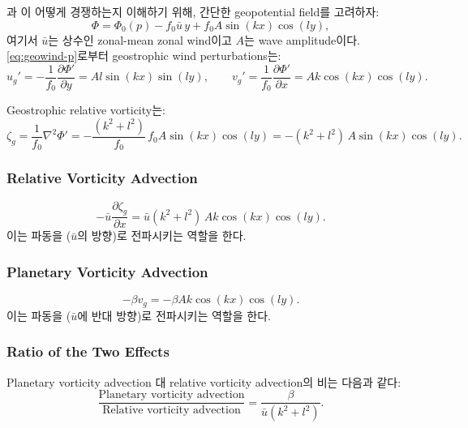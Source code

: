과
이 어떻게 경쟁하는지 이해하기 위해,
간단한 geopotential field를 고려하자:
\begin{equation}\label{eq:wave-geopot}
  \Phi = \Phi_0(p) - f_0\bar{u}\,y + f_0 A\sin(kx)\cos(ly),
\end{equation}
여기서 $\bar{u}$는 상수인 zonal-mean zonal wind이고 $A$는 wave amplitude이다.
\eqref{eq:geowind-p}로부터 geostrophic wind perturbations는:
\[
  u_g' = -\frac{1}{f_0}\frac{\partial\Phi'}{\partial y}
       = Al\sin(kx)\sin(ly),
  \qquad
  v_g' = \frac{1}{f_0}\frac{\partial\Phi'}{\partial x}
       = Ak\cos(kx)\cos(ly).
\]

\noindent
Geostrophic relative vorticity는:
\[
  \zeta_g = \frac{1}{f_0}\nabla^2\Phi'
  = -\frac{(k^2 + l^2)}{f_0}\,f_0 A\sin(kx)\cos(ly)
  = -(k^2 + l^2)\,A\sin(kx)\cos(ly).
\]

\subsubsection{Relative Vorticity Advection}

\[
  -\bar{u}\frac{\partial\zeta_g}{\partial x}
  = \bar{u}(k^2+l^2)\,Ak\cos(kx)\cos(ly).
\]
이는 파동을  ($\bar{u}$의 방향)로 전파시키는 역할을 한다.

\subsubsection{Planetary Vorticity Advection}

\[
  -\beta v_g = -\beta Ak\cos(kx)\cos(ly).
\]
이는 파동을  ($\bar{u}$에 반대 방향)로 전파시키는 역할을 한다.

\subsubsection{Ratio of the Two Effects}

Planetary vorticity advection 대 relative vorticity advection의 비는 다음과 같다:
\begin{equation}\label{eq:wave-ratio}
  \boxed{
  \frac{\text{Planetary vorticity advection}}
       {\text{Relative vorticity advection}}
  = \frac{\beta}{\bar{u}(k^2 + l^2)}.
  }
\end{equation}

